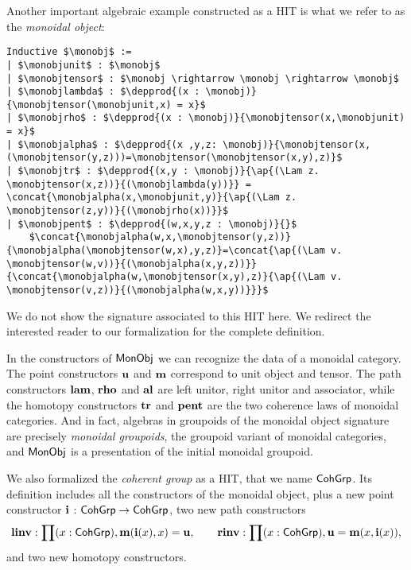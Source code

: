 Another important algebraic example constructed as a HIT is what we
refer to as the \emph{monoidal object}:
\begin{lstlisting}[mathescape=true]
Inductive $\monobj$ :=
| $\monobjunit$ : $\monobj$
| $\monobjtensor$ : $\monobj \rightarrow \monobj \rightarrow \monobj$
| $\monobjlambda$ : $\depprod{(x : \monobj)}{\monobjtensor(\monobjunit,x) = x}$
| $\monobjrho$ : $\depprod{(x : \monobj)}{\monobjtensor(x,\monobjunit) = x}$
| $\monobjalpha$ : $\depprod{(x ,y,z: \monobj)}{\monobjtensor(x,(\monobjtensor(y,z)))=\monobjtensor(\monobjtensor(x,y),z)}$
| $\monobjtr$ : $\depprod{(x,y : \monobj)}{\ap{(\Lam z. \monobjtensor(x,z))}{(\monobjlambda(y))}} = \concat{\monobjalpha(x,\monobjunit,y)}{\ap{(\Lam z. \monobjtensor(z,y))}{(\monobjrho(x))}}$
| $\monobjpent$ : $\depprod{(w,x,y,z : \monobj)}{}$
    $\concat{\monobjalpha(w,x,\monobjtensor(y,z))}{\monobjalpha(\monobjtensor(w,x),y,z)}=\concat{\ap{(\Lam v. \monobjtensor(w,v))}{(\monobjalpha(x,y,z))}}{\concat{\monobjalpha(w,\monobjtensor(x,y),z)}{\ap{(\Lam v. \monobjtensor(v,z))}{(\monobjalpha(w,x,y))}}}$
\end{lstlisting}
We do not show the signature associated to this HIT here. We redirect
the interested reader to our formalization for the complete
definition.

In the constructors of $\mathsf{MonObj}$ we can recognize the data of a
monoidal category. The point constructors $\operatorname{\mathbf{u}}$ and
$\operatorname{\mathbf{m}}$ correspond to unit object and tensor. The path
constructors $\operatorname{\mathbf{lam}}$, $\operatorname{\mathbf{rho}}$ and $\operatorname{\mathbf{al}}$ are left
unitor, right unitor and associator, while the homotopy constructors
$\operatorname{\mathbf{tr}}$ and $\operatorname{\mathbf{pent}}$ are the two coherence laws of
monoidal categories. And in fact, algebras in groupoids of the
monoidal object signature are precisely
\emph{monoidal groupoids}, the groupoid variant of monoidal
categories, and $\mathsf{MonObj}$ is a presentation of the initial
monoidal groupoid.


We also formalized the \emph{coherent group} \cite{baez2004groups} as
a HIT, that we name $\mathsf{CohGrp}$.  Its definition includes all the
constructors of the monoidal object, plus a new point constructor
$\operatorname{\mathbf{i}}$ : $\mathsf{CohGrp} \rightarrow \mathsf{CohGrp}$, two new path
constructors
\[
\operatorname{\mathbf{linv}} : \prod (x : \mathsf{CohGrp}) , \operatorname{\mathbf{m}}(\operatorname{\mathbf{i}}(x),x) = \operatorname{\mathbf{u}},
\quad\quad
\operatorname{\mathbf{rinv}} : \prod (x : \mathsf{CohGrp}) , \operatorname{\mathbf{u}} = \operatorname{\mathbf{m}}(x,\operatorname{\mathbf{i}}(x)),
\]
and two new homotopy constructors.


